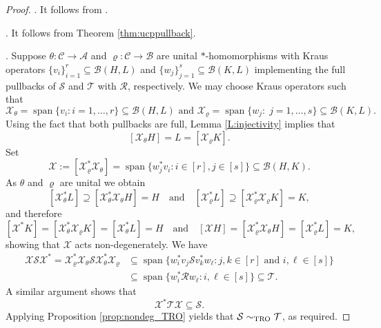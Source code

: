 \documentclass[11pt]{amsart}
\numberwithin{equation}{section}
\theoremstyle{plain}
\theoremstyle{definition}
\theoremstyle{remark}
\newcommand{\A}{{\mathcal{A}}}
\newcommand{\B}{{\mathcal{B}}}
\newcommand{\C}{{\mathcal{C}}}
\newcommand{\R}{{\mathcal{R}}}
\renewcommand{\S}{{\mathcal{S}}}
\newcommand{\T}{{\mathcal{T}}}
\newcommand{\X}{{\mathcal{X}}}
\newcommand{\qand}{\quad\text{and}\quad}
\newcommand{\spn}{\operatorname{span}}
\begin{document}
\begin{proof}
\noindent
[(i) $\Leftrightarrow $ (ii)]. It follows from \cite[Theorem 7.5]{EKT21}.

\medskip
{}. It follows from Theorem \ref{thm:ucppullback}.

\medskip 
{}. Suppose $\theta\colon \C\rightarrow \A$ and $\varrho \colon \C\rightarrow \B$ are unital $*$-homomorphisms with Kraus operators $\{v_{i}\}_{i=1}^{r} \subseteq \B(H, L)$ and $\{w_{j}\}_{j=1}^{s} \subseteq \B(K, L)$ implementing the full pullbacks of $\S$ and $\T$ with $\R$, respectively. We may choose Kraus operators such that
\[
\X_{\theta} = \spn\{v_{i}:  i = 1, \hdots, r\} \subseteq \B(H, L) \text{ and } \X_{\varrho} = \spn\{w_{j}:\; j = 1, \hdots, s\} \subseteq \B(K, L).
\]
Using the fact that both pullbacks are full, Lemma \ref{L:injectivity} implies that
\[
[\X_{\theta} H] = L = [\X_{\varrho} K].
\]
Set 
\[
\X := [\X_{\varrho}^{*} \X_{\theta}] = \spn\{w_{j}^{*}v_{i}:  i \in [r], j \in [s]\} \subseteq \B(H, K).
\]
As $\theta$ and $\varrho$ are unital we obtain 
\[
[\X_{\theta}^{*} L] \supseteq [\X_{\theta}^{*}\X_{\theta} H] = H \qand [\X_\varrho^{*}L] \supseteq [\X_\varrho^{*}\X_\varrho K] = K,
\]
and therefore 
\[
[\X^{*}K] = [\X_{\theta}^{*} \X_{\varrho} K] = [\X_{\theta}^{*} L] = H
\qand
[\X H] = [\X_{\varrho}^{*}\X_{\theta} H] = [\X_{\varrho}^{*}L] = K,
\]
showing that $\X$ acts non-degenerately. 
We have
\begin{align*}
\X\S\X^{*}= \X_\varrho^* \X_\theta \S \X_\theta^* \X_\varrho 
&\subseteq 
\spn\{  w_i^* v_j  \S  v_k^*  w_\ell  : j,k \in [r] \text{ and } i,\ell \in[s]\}\\
&\subseteq
\spn\{  w_i^*  \R  w_\ell  : i,\ell \in[s]\}\subseteq \T.
\end{align*}
A similar argument shows that
\[
\X^{*}\T\X \subseteq \S.
\]
Applying Proposition \ref{prop:nondeg_TRO} yields that $\S \sim_{\rm TRO} \T$, as required. 


\end{proof}
\end{document}
